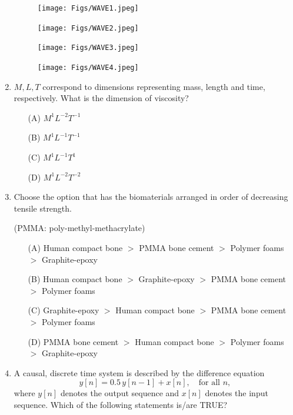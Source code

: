 \documentclass[journal]{IEEEtran}
\begin{document}
\begin{enumerate}
\begin{figure}[H]
\centering
\texttt{[image: Figs/WAVE1.jpeg]}
\caption{}
\end{figure}

\begin{figure}[H]
\centering
\texttt{[image: Figs/WAVE2.jpeg]}
\caption{}
\end{figure}

\begin{figure}[H]
\centering
\texttt{[image: Figs/WAVE3.jpeg]}
\caption{}
\end{figure}

\begin{figure}[H]
\centering
\texttt{[image: Figs/WAVE4.jpeg]}
\caption{}
\end{figure}
\hfill{}

\item  \( M, L, T \) correspond to dimensions representing mass, length and time, respectively. What is the dimension of viscosity?

\begin{enumerate}
    \item[(A)] \( M^1 L^{-2} T^{-1} \)
    \item[(B)] \( M^1 L^{-1} T^{-1} \)
    \item[(C)] \( M^1 L^{-1} T^{1} \)
    \item[(D)] \( M^1 L^{-2} T^{-2} \)
\end{enumerate}
\hfill{}

\item  Choose the option that has the biomaterials arranged in order of decreasing tensile strength.

(PMMA: poly-methyl-methacrylate)

\begin{enumerate}
    \item[(A)] Human compact bone $>$ PMMA bone cement $>$ Polymer foams $>$ Graphite-epoxy
    \item[(B)] Human compact bone $>$ Graphite-epoxy $>$ PMMA bone cement $>$ Polymer foams
    \item[(C)] Graphite-epoxy $>$ Human compact bone $>$ PMMA bone cement $>$ Polymer foams
    \item[(D)] PMMA bone cement $>$ Human compact bone $>$ Polymer foams $>$ Graphite-epoxy
\end{enumerate}
\hfill{}

\item  A causal, discrete time system is described by the difference equation
\[
y[n] = 0.5 \, y[n - 1] + x[n], \quad \text{for all } n,
\]
where \( y[n] \) denotes the output sequence and \( x[n] \) denotes the input sequence.
Which of the following statements is/are TRUE?


\end{enumerate}
\end{document}
